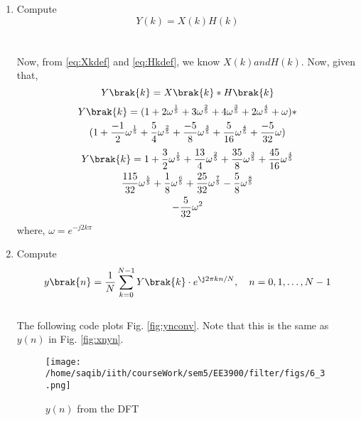\documentclass[journal,12pt,twocolumn]{IEEEtran}
\renewcommand\thesection{\arabic{section}}
\begin{document}
\begin{enumerate}[label=\thesection.\arabic*]
\item Compute 
\begin{equation}
	\label{eq:comp_yk}	
	Y(k) = X(k)H(k)
\end{equation}
\\\solution\\Now, from \eqref{eq:Xkdef} and \eqref{eq:Hkdef}, we know $X(k) and H(k)$. Now, given that,
\begin{equation}
	Y\brak{k}=X\brak{k}*H\brak{k}
\end{equation}
\begin{multline}
	Y\brak{k}= (1+2\omega^{\frac{1}{5}}+3\omega^{\frac{2}{5}}+4\omega^{\frac{3}{5}}+2\omega^{\frac{4}{5}}+\omega)* \\(1+\frac{-1}{2}\omega^{\frac{1}{5}}+\frac{5}{4}\omega^{\frac{2}{5}}+\frac{-5}{8}\omega^{\frac{3}{5}}+\frac{5}{16}\omega^{\frac{4}{5}}+\frac{-5}{32}\omega)
\end{multline}
\begin{multline}
	Y\brak{k}= 1+\frac{3}{2}\omega^{\frac{1}{5}}+\frac{13}{4}\omega^{\frac{2}{5}}+\frac{35}{8}\omega^{\frac{3}{5}}+\frac{45}{16}\omega^{\frac{4}{5}}\\\frac{115}{32}\omega^{\frac{5}{5}}+\frac{1}{8}\omega^{\frac{6}{5}}+\frac{25}{32}\omega^{\frac{7}{5}}-\frac{5}{8}\omega^{\frac{8}{5}}\\-\frac{5}{32}\omega^{2} 
\end{multline}
where, $\omega=e^{-j2k\pi}$
\item Compute
\begin{equation}
 y\brak{n}={\frac {1}{N}}\sum _{k=0}^{N-1}Y\brak{k}\cdot e^{\j 2\pi kn/N},\quad n = 0,1,\dots, N-1
\end{equation}
\\
\solution The following code plots Fig. \ref{fig:ynconv}. Note that this is the same as 
$y(n)$ in  Fig. 
\ref{fig:xnyn}. 
%


\begin{figure}[!ht]
\centering
\texttt{[image: /home/saqib/iith/courseWork/sem5/EE3900/filter/figs/6\_3.png]}
\caption{$y(n)$ from the DFT}
\label{fig:yndft}
\end{figure}


\end{enumerate}
\end{document}
